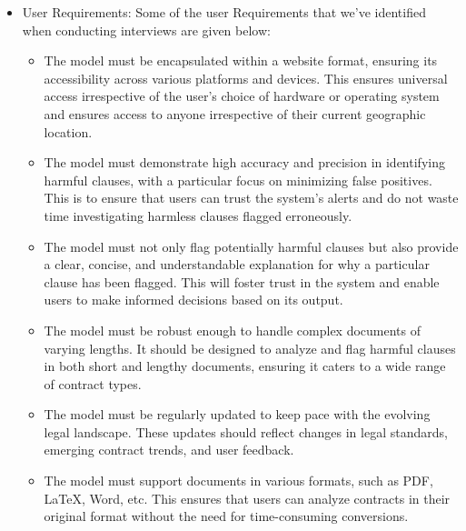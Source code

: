 \begin{itemize}
    \item User Requirements: Some of the user Requirements that we've identified when conducting interviews are given below: 
    \begin{itemize}
        \item The model must be encapsulated within a website format, ensuring its accessibility across various platforms and devices. This ensures universal access irrespective of the user's choice of hardware or operating system and ensures access to anyone irrespective of their current geographic location. 
        \item The model must demonstrate high accuracy and precision in identifying harmful clauses, with a particular focus on minimizing false positives. This is to ensure that users can trust the system's alerts and do not waste time investigating harmless clauses flagged erroneously.
        \item  The model must not only flag potentially harmful clauses but also provide a clear, concise, and understandable explanation for why a particular clause has been flagged. This will foster trust in the system and enable users to make informed decisions based on its output.
        \item The model must be robust enough to handle complex documents of varying lengths. It should be designed to analyze and flag harmful clauses in both short and lengthy documents, ensuring it caters to a wide range of contract types.
        \item The model must be regularly updated to keep pace with the evolving legal landscape. These updates should reflect changes in legal standards, emerging contract trends, and user feedback.
        \item The model must support documents in various formats, such as PDF, LaTeX, Word, etc. This ensures that users can analyze contracts in their original format without the need for time-consuming conversions.


        














\end{itemize}
\end{itemize}
